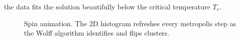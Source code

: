 \documentclass[singlepage,notitlepage,nofootinbib,11pt]{revtex4-1}
\begin{document}
the data fits the solution beautifully below the critical temperature $T_c$.
\begin{figure}[h]
  \centering
  \captionsetup[subfigure]{labelformat=empty}
  \caption{\label{animation} Spin animation. The 2D histogram refreshes every metropolis step as the Wolff algorithm identifies and flips clusters.}
\end{figure}
\end{document}
